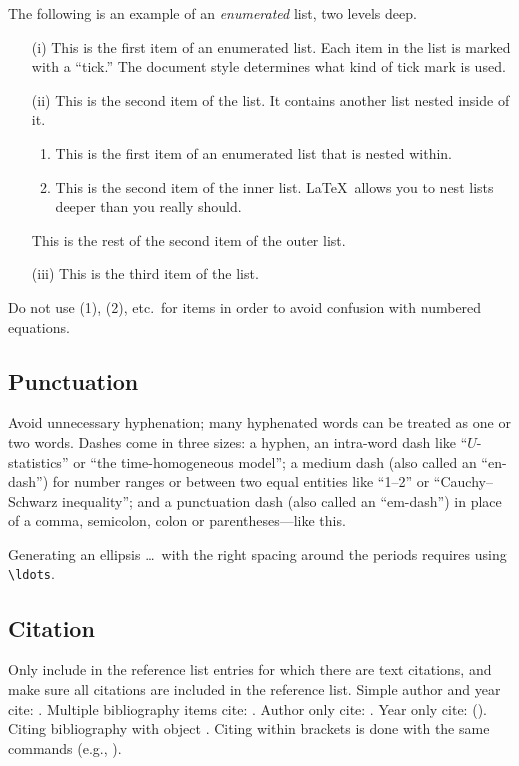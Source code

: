 \documentclass[ecta,nameyear,final,supplement]{econsocart}
\theoremstyle{plain}
\theoremstyle{definition}
\begin{document}
The following is an example of an \emph{enumerated} list, two levels deep.
\begin{enumerate}[(ii)]
\item[(i)]
This is the first item of an enumerated list.  Each item
in the list is marked with a ``tick.''  The document
style determines what kind of tick mark is used.
\item[(ii)]
This is the second item of the list.  It contains another
list nested inside of it.
\begin{enumerate}
\item
This is the first item of an enumerated list that
is nested within.
\item
This is the second item of the inner list.  \LaTeX\
allows you to nest lists deeper than you really should.
\end{enumerate}
This is the rest of the second item of the outer list.
\item [(iii)]
This is the third item of the list.
\end{enumerate}

Do not use (1), (2), etc.\ for items in order to avoid confusion with numbered equations.

\subsection{Punctuation}
Avoid unnecessary hyphenation; many hyphenated words can be treated as one or two words.
Dashes come in three sizes: a hyphen, an intra-word dash like ``$U$-statistics'' or ``the time-homogeneous model'';
a medium dash (also called an ``en-dash'') for number ranges or between two equal entities like ``1--2'' or ``Cauchy--Schwarz inequality'';
and a punctuation dash (also called an ``em-dash'') in place of a comma, semicolon,
colon or parentheses---like this.

Generating an ellipsis \ldots\ with the right spacing
around the periods requires using \verb|\ldots|.

\subsection{Citation}
Only include in the reference list entries for which there are text citations,
and make sure all citations are included in the reference list.
Simple author and year cite: \citet{b1}. 
Multiple bibliography items cite: \citet{b2,b3,b4,b5}.
Author only cite: \citeauthor{b4}.
Year only cite: (\citeyear{b4}). Citing bibliography with object \citet[Theorem 1]{b1}. Citing within brackets is done with the same commands (e.g., \citet{b2,b3,b4}).
\end{document}
